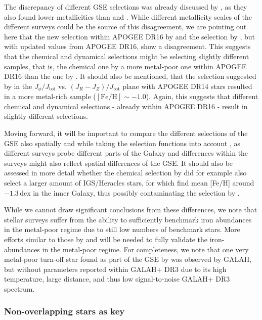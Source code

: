 \documentclass[fleqn,usenatbib]{mnras}
\newcommand{\dex}{\,\mathrm{dex}}	%
\begin{document}
The discrepancy of different GSE selections was already discussed by \citet{Bonifacio2021}, as they also found lower metallicities than \citet{Naidu2020} and \citet{Feuillet2020}. While different metallicity scales of the different surveys could be the source of this disagreement, we are pointing out here that the new selection within APOGEE DR16 by \citet{Feuillet2021} and the selection by \citet{Das2020}, but with updated values from APOGEE DR16, show a disagreement. This suggests that the chemical and dynamical selections might be selecting slightly different samples, that is, the chemical one by \citet{Das2020} a more metal-poor one within APOGEE DR16 than the one by \citet{Feuillet2021}. It should also be mentioned, that the selection suggested by \citet{Myeong2019} in the $J_\phi/J_\text{tot}$ vs. $\left(J_R - J_Z\right)/J_\text{tot}$ plane with APOGEE DR14 stars resulted in a more metal-rich sample ($\mathrm{[Fe/H]} \sim -1.0$). Again, this suggests that different chemical and dynamical selections - already within APOGEE DR16 - result in slightly different selections.

Moving forward, it will be important to compare the different selections of the GSE also spatially and while taking the selection functions into account \citep[e.g.][]{Lane2021}, as different surveys probe different parts of the Galaxy and differences within the surveys might also reflect spatial differences of the GSE. It should also be assessed in more detail whether the chemical selection by \citet{Das2020} did for example also select a larger amount of IGS/Heracles stars, for which \citet{Horta2021} find mean [Fe/H] around $-1.3\dex$ in the inner Galaxy, thus possibly contaminating the selection by \citet{Das2020}.

While we cannot draw significant conclusions from these differences, we note that stellar surveys suffer from the ability to sufficiently benchmark iron abundances in the metal-poor regime due to still low numbers of benchmark stars. More efforts similar to those by \citet{Hawkins2016} and \citet{Karovicova2020} will be needed to fully validate the iron-abundances in the metal-poor regime. For completeness, we note that one very metal-poor turn-off star found as part of the GSE by \citet{Naidu2020} was observed by GALAH, but without parameters reported within GALAH+ DR3 due to its high temperature, large distance, and thus low signal-to-noise GALAH+ DR3 spectrum.

\subsubsection{Non-overlapping stars as key} \label{sec:non_overlap}
\end{document}
